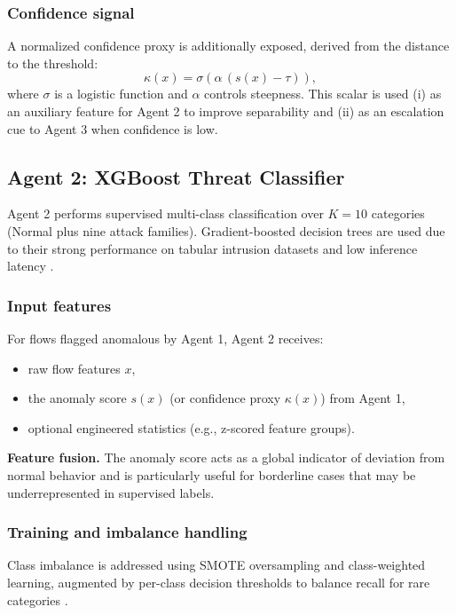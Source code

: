 \documentclass[conference]{IEEEtran}
\begin{document}
\subsubsection{Confidence signal}
A normalized confidence proxy is additionally exposed, derived from the distance to the threshold:
\begin{equation}
 \kappa(x) = \sigma\left(\alpha\,(s(x)-\tau)\right),
\end{equation}
where $\sigma$ is a logistic function and $\alpha$ controls steepness. This scalar is used (i) as an auxiliary feature for Agent 2 to improve separability and (ii) as an escalation cue to Agent 3 when confidence is low.

\subsection{Agent 2: XGBoost Threat Classifier}
\label{sec:agent2_method}

Agent 2 performs supervised multi-class classification over $K=10$ categories (Normal plus nine attack families). Gradient-boosted decision trees are used due to their strong performance on tabular intrusion datasets and low inference latency \cite{Chen2016XGBoost}.

\subsubsection{Input features}
For flows flagged anomalous by Agent 1, Agent 2 receives:
\begin{itemize}
  \item raw flow features $x$,
  \item the anomaly score $s(x)$ (or confidence proxy $\kappa(x)$) from Agent 1,
  \item optional engineered statistics (e.g., z-scored feature groups).
\end{itemize}

\textbf{Feature fusion.} The anomaly score acts as a global indicator of deviation from normal behavior and is particularly useful for borderline cases that may be underrepresented in supervised labels.

\subsubsection{Training and imbalance handling}
Class imbalance is addressed using SMOTE oversampling and class-weighted learning, augmented by per-class decision thresholds to balance recall for rare categories \cite{Chawla2002SMOTE}.
\end{document}
